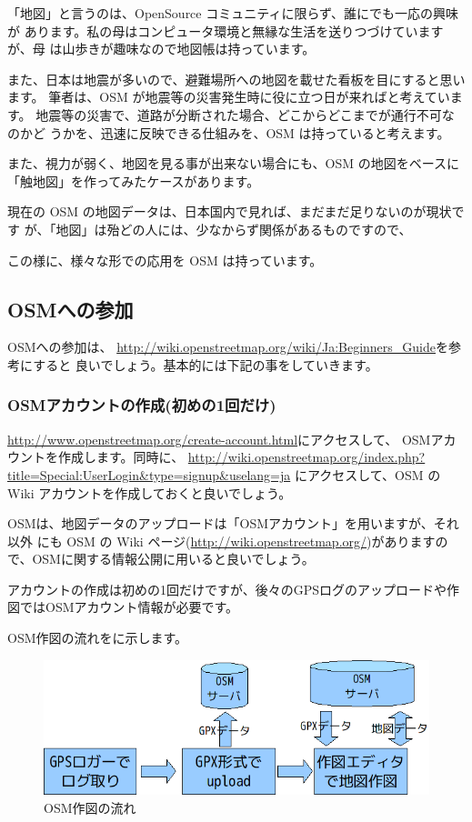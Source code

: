 \documentclass[mingoth,a4paper]{jsarticle}
\begin{document}
「地図」と言うのは、OpenSource コミュニティに限らず、誰にでも一応の興味が
あります。私の母はコンピュータ環境と無縁な生活を送りつづけていますが、母
は山歩きが趣味なので地図帳は持っています。

また、日本は地震が多いので、避難場所への地図を載せた看板を目にすると思い
ます。
筆者は、OSM が地震等の災害発生時に役に立つ日が来ればと考えています。
地震等の災害で、道路が分断された場合、どこからどこまでが通行不可なのかど
うかを、迅速に反映できる仕組みを、OSM は持っていると考えます。

また、視力が弱く、地図を見る事が出来ない場合にも、OSM の地図をベースに
「触地図」を作ってみたケースがあります。

現在の OSM の地図データは、日本国内で見れば、まだまだ足りないのが現状です
が、「地図」は殆どの人には、少なからず関係があるものですので、

この様に、様々な形での応用を OSM は持っています。

\subsection{OSMへの参加}

OSMへの参加は、
\url{http://wiki.openstreetmap.org/wiki/Ja:Beginners_Guide}を参考にすると
良いでしょう。基本的には下記の事をしていきます。

\subsubsection{OSMアカウントの作成(初めの1回だけ)}

\url{http://www.openstreetmap.org/create-account.html}にアクセスして、
OSMアカウントを作成します。同時に、
\url{http://wiki.openstreetmap.org/index.php?title=Special:UserLogin&type=signup&uselang=ja}
にアクセスして、OSM の Wiki アカウントを作成しておくと良いでしょう。

OSMは、地図データのアップロードは「OSMアカウント」を用いますが、それ以外
にも OSM の Wiki ページ(\url{http://wiki.openstreetmap.org/})がありますの
で、OSMに関する情報公開に用いると良いでしょう。

アカウントの作成は初めの1回だけですが、後々のGPSログのアップロードや作図ではOSMアカウント情報が必要です。

OSM作図の流れをに示します。

\begin{figure}[h]
 \centering
 \includegraphics[scale=0.7]{image200912/debianosm4.png}
 \caption{OSM作図の流れ}
 \label{fig:debianosm4}
\end{figure}
\end{document}
